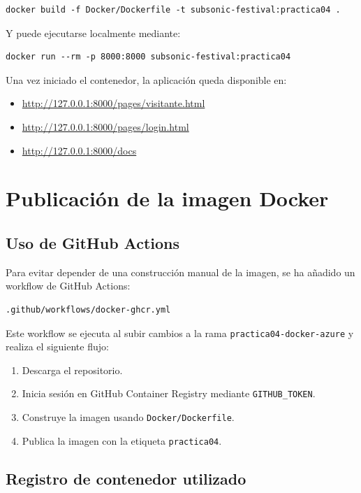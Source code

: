 \documentclass[11pt,a4paper]{article}
\begin{document}
\begin{verbatim}
docker build -f Docker/Dockerfile -t subsonic-festival:practica04 .
\end{verbatim}

Y puede ejecutarse localmente mediante:

\begin{verbatim}
docker run --rm -p 8000:8000 subsonic-festival:practica04
\end{verbatim}

Una vez iniciado el contenedor, la aplicaci\'on queda disponible en:

\begin{itemize}
  \item \url{http://127.0.0.1:8000/pages/visitante.html}
  \item \url{http://127.0.0.1:8000/pages/login.html}
  \item \url{http://127.0.0.1:8000/docs}
\end{itemize}

\section{Publicaci\'on de la imagen Docker}

\subsection{Uso de GitHub Actions}

Para evitar depender de una construcci\'on manual de la imagen, se ha a\~nadido un workflow de GitHub Actions:

\begin{verbatim}
.github/workflows/docker-ghcr.yml
\end{verbatim}

Este workflow se ejecuta al subir cambios a la rama \texttt{practica04-docker-azure} y realiza el siguiente flujo:

\begin{enumerate}
  \item Descarga el repositorio.
  \item Inicia sesi\'on en GitHub Container Registry mediante \texttt{GITHUB\_TOKEN}.
  \item Construye la imagen usando \texttt{Docker/Dockerfile}.
  \item Publica la imagen con la etiqueta \texttt{practica04}.
\end{enumerate}

\subsection{Registro de contenedor utilizado}
\end{document}
